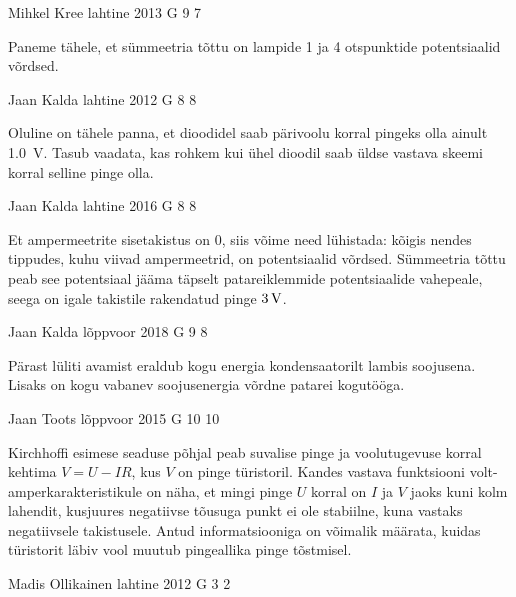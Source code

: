 \documentclass[11pt, twoside]{article}
\begin{document}
{%
{Mihkel Kree} %
{lahtine} %
{2013} %
{G 9} %
{7} %
{

\ifHint
Paneme tähele, et sümmeetria tõttu on lampide 1 ja 4 otspunktide potentsiaalid võrdsed.
\fi
}

{Jaan Kalda} %
{lahtine} %
{2012} %
{G 8} %
{8} %
{

\ifHint
Oluline on tähele panna, et dioodidel saab pärivoolu korral pingeks olla ainult \SI{1,0}{V}. Tasub vaadata, kas rohkem kui ühel dioodil saab üldse vastava skeemi korral selline pinge olla.
\fi
}

{Jaan Kalda} %
{lahtine} %
{2016} %
{G 8} %
{8} %
{

\ifHint
Et ampermeetrite sisetakistus on \num{0}, siis võime need lühistada: kõigis nendes tippudes, kuhu viivad ampermeetrid, on potentsiaalid võrdsed. Sümmeetria tõttu peab see 
potentsiaal jääma täpselt patareiklemmide potentsiaalide vahepeale, seega on igale takistile rakendatud pinge
$\SI 3V$.
\fi
}

{Jaan Kalda} %
{lõppvoor} %
{2018} %
{G 9} %
{8} %
{

\ifHint
Pärast lüliti avamist eraldub kogu energia kondensaatorilt lambis soojusena. Lisaks on kogu vabanev soojusenergia võrdne patarei kogutööga.
\fi
}

{Jaan Toots} %
{lõppvoor} %
{2015} %
{G 10} %
{10} %
{

\ifHint
Kirchhoffi esimese seaduse põhjal peab suvalise pinge ja voolutugevuse korral kehtima $V = U - IR$, kus $V$ on pinge türistoril. Kandes vastava funktsiooni volt-amperkarakteristikule on näha, et mingi pinge $U$ korral on $I$ ja $V$ jaoks kuni kolm lahendit, kusjuures negatiivse tõusuga punkt ei ole stabiilne, kuna vastaks negatiivsele takistusele. Antud informatsiooniga on võimalik määrata, kuidas türistorit läbiv vool muutub pingeallika pinge tõstmisel.
\fi
}

{Madis Ollikainen} %
{lahtine} %
{2012} %
{G 3} %
{2} %
{

}}
\end{document}
